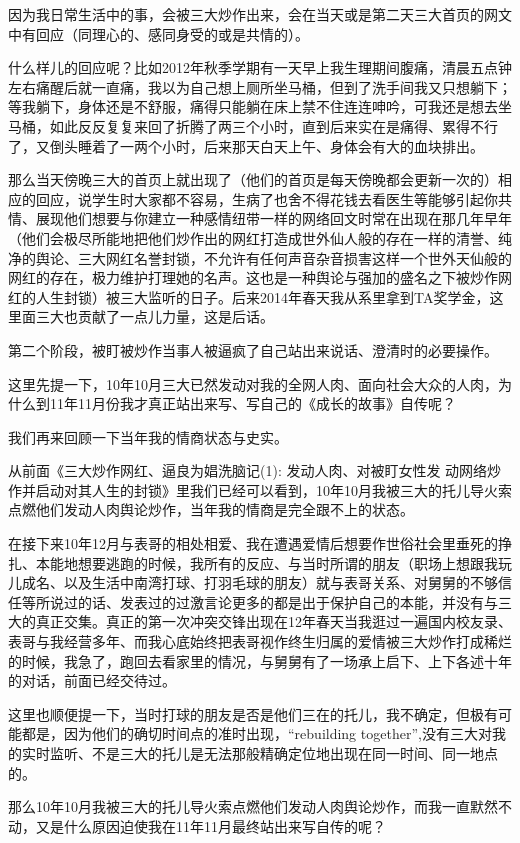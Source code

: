 \documentclass[9pt, b5paper]{article}
\begin{document}
因为我日常生活中的事，会被三大炒作出来，会在当天或是第二天三大首页的网文中有回应（同理心的、感同身受的或是共情的）。

什么样儿的回应呢？比如2012年秋季学期有一天早上我生理期间腹痛，清晨五点钟左右痛醒后就一直痛，我以为自己想上厕所坐马桶，但到了洗手间我又只想躺下；等我躺下，身体还是不舒服，痛得只能躺在床上禁不住连连呻吟，可我还是想去坐马桶，如此反反复复来回了折腾了两三个小时，直到后来实在是痛得、累得不行了，又倒头睡着了一两个小时，后来那天白天上午、身体会有大的血块排出。

那么当天傍晚三大的首页上就出现了（他们的首页是每天傍晚都会更新一次的）相应的回应，说学生时大家都不容易，生病了也舍不得花钱去看医生等能够引起你共情、展现他们想要与你建立一种感情纽带一样的网络回文时常在出现在那几年早年（他们会极尽所能地把他们炒作出的网红打造成世外仙人般的存在一样的清誉、纯净的舆论、三大网红名誉封锁，不允许有任何声音杂音损害这样一个世外天仙般的网红的存在，极力维护打理她的名声。这也是一种舆论与强加的盛名之下被炒作网红的人生封锁）被三大监听的日子。后来2014年春天我从系里拿到TA奖学金，这里面三大也贡献了一点儿力量，这是后话。 

第二个阶段，被盯被炒作当事人被逼疯了自己站出来说话、澄清时的必要操作。 

这里先提一下，10年10月三大已然发动对我的全网人肉、面向社会大众的人肉，为什么到11年11月份我才真正站出来写、写自己的《成长的故事》自传呢？

我们再来回顾一下当年我的情商状态与史实。 

从前面《三大炒作网红、逼良为娼洗脑记(1): 发动人肉、对被盯女性发 动网络炒作并启动对其人生的封锁》里我们已经可以看到，10年10月我被三大的托儿导火索点燃他们发动人肉舆论炒作，当年我的情商是完全跟不上的状态。 

在接下来10年12月与表哥的相处相爱、我在遭遇爱情后想要作世俗社会里垂死的挣扎、本能地想要逃跑的时候，我所有的反应、与当时所谓的朋友（职场上想跟我玩儿成名、以及生活中南湾打球、打羽毛球的朋友）就与表哥关系、对舅舅的不够信任等所说过的话、发表过的过激言论更多的都是出于保护自己的本能，并没有与三大的真正交集。真正的第一次冲突交锋出现在12年春天当我逛过一遍国内校友录、表哥与我经营多年、而我心底始终把表哥视作终生归属的爱情被三大炒作打成稀烂的时候，我急了，跑回去看家里的情况，与舅舅有了一场承上启下、上下各述十年的对话，前面已经交待过。

这里也顺便提一下，当时打球的朋友是否是他们三在的托儿，我不确定，但极有可能都是，因为他们的确切时间点的准时出现，“rebuilding together”,没有三大对我的实时监听、不是三大的托儿是无法那般精确定位地出现在同一时间、同一地点的。 

那么10年10月我被三大的托儿导火索点燃他们发动人肉舆论炒作，而我一直默然不动，又是什么原因迫使我在11年11月最终站出来写自传的呢？
\end{document}

